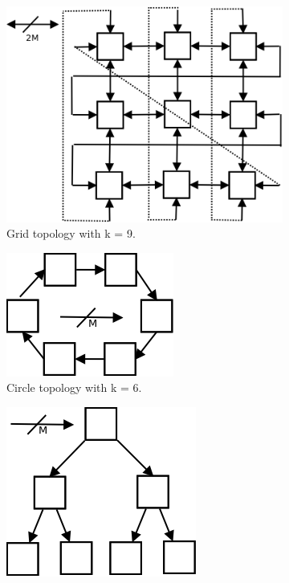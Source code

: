 \begin{figure}
    \centering
    \begin{subfigure}{0.5\textwidth}\label{subfig:grid}
	    \centering
        \includegraphics[width=0.6\linewidth]{figures/grid.png}
        \caption{Grid topology with k = 9.}
    \end{subfigure}
    \begin{subfigure}{0.5\textwidth}\label{subfig:wheel}
	    \centering
        \includegraphics[width=0.6\linewidth]{figures/wheel.png}
        \caption{Circle topology with k = 6.}
    \end{subfigure}
    \begin{subfigure}{0.5\textwidth}\label{subfig:tree}
    \centering
        \includegraphics[width=0.6\linewidth]{figures/tree.png}

\end{subfigure}
\end{figure}
